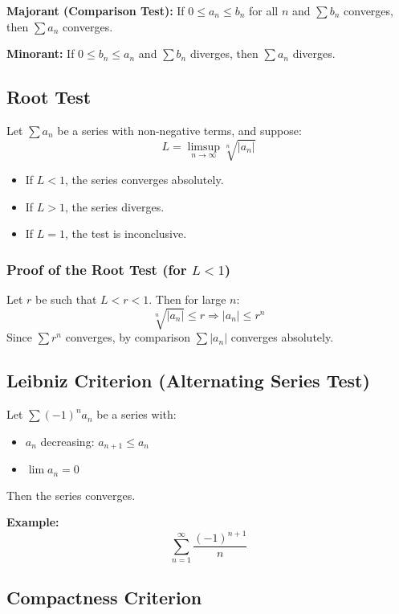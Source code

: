 \textbf{Majorant (Comparison Test):} If \(0 \le a_n \le b_n\) for all \(n\) and \(\sum b_n\) converges, then \(\sum a_n\) converges.

\noindent \textbf{Minorant:} If \(0 \le b_n \le a_n\) and \(\sum b_n\) diverges, then \(\sum a_n\) diverges.

\subsection{Root Test}

Let \(\sum a_n\) be a series with non-negative terms, and suppose:
\[
L = \limsup_{n \to \infty} \sqrt[n]{|a_n|}
\]

\begin{itemize}[label=\(-\)]
\item If \(L < 1\), the series converges absolutely.
\item If \(L > 1\), the series diverges.
\item If \(L = 1\), the test is inconclusive.
\end{itemize}

\subsubsection*{Proof of the Root Test (for \(L < 1\))}

Let \(r\) be such that \(L < r < 1\). Then for large \(n\):
\[
\sqrt[n]{|a_n|} \le r \Rightarrow |a_n| \le r^n
\]
Since \(\sum r^n\) converges, by comparison \(\sum |a_n|\) converges absolutely.

\subsection{Leibniz Criterion (Alternating Series Test)}

Let \(\sum (-1)^n a_n\) be a series with:
\begin{itemize}[label=\(-\)]
\item \(a_n\) decreasing: \(a_{n+1} \le a_n\)
\item \(\lim a_n = 0\)
\end{itemize}
Then the series converges.

\textbf{Example:}
\[
\sum_{n=1}^\infty \frac{(-1)^{n+1}}{n}
\]

\subsection{Compactness Criterion}


